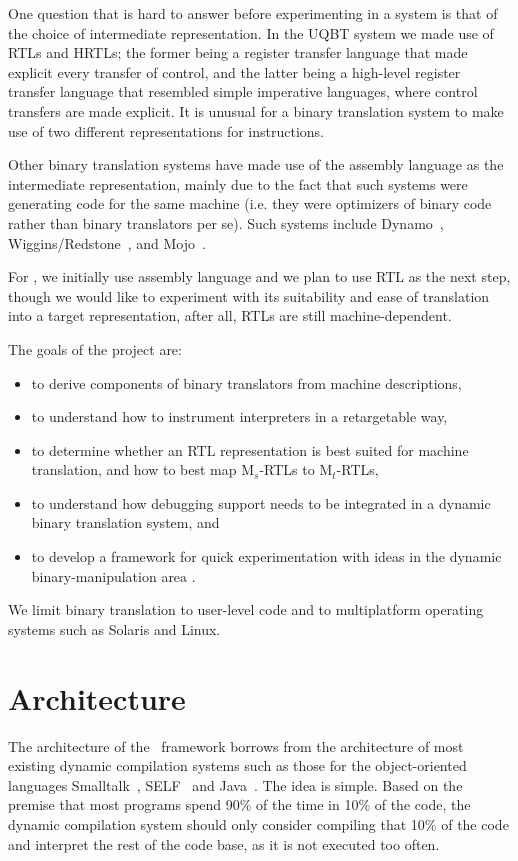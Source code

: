 One question that is hard to answer before experimenting in a system 
is that of the choice of intermediate representation. 
In the UQBT system we made use of RTLs and HRTLs; the former being a 
register transfer language that made explicit every transfer of control, 
and the latter being a high-level register transfer language that 
resembled simple imperative languages, where control transfers are 
made explicit.  It is unusual for a binary translation system to 
make use of two different representations for instructions.  

Other binary translation systems have made use of the assembly language 
as the intermediate representation, mainly due to the fact that such 
systems were generating code for the same machine (i.e. they were optimizers
of binary code rather than binary translators per se).  Such 
systems include Dynamo~\cite{Bala00}, Wiggins/Redstone~\cite{Reev00}, 
and Mojo~\cite{Chen00}. 

For \walk, we initially use assembly language and we plan to use
RTL as the next step, though we would like to experiment with its 
suitability and ease of translation into a target representation, 
after all, RTLs are still machine-dependent.  

The goals of the project are: 
\begin{itemize}
\item to derive components of binary translators from machine descriptions,
\item to understand how to instrument interpreters in a retargetable way, 
\item to determine whether an RTL representation is best suited for machine 
	translation, and how to best map M$_s$-RTLs to M$_t$-RTLs, 
\item to understand how debugging support needs to be integrated in 
	a dynamic binary translation system, and 
\item to develop a framework for quick experimentation with ideas in the 
	dynamic binary-manipulation area . 
\end{itemize}

We limit binary translation to user-level code and to multiplatform 
operating systems such as Solaris and Linux.  


\section{Architecture}

The architecture of the \walk\ framework borrows from the architecture 
of most existing dynamic compilation systems such as those for the 
object-oriented languages Smalltalk~\cite{Gold83,Deut84},  
SELF~\cite{Unga87,Holz94} and Java~\cite{Holz97,Grie00,Pale01}.
The idea is simple.  Based on the premise that most programs spend 
90\% of the time in 10\% of the code, the dynamic compilation 
system should only consider compiling that 10\% of the code and 
interpret the rest of the code base, as it is not executed too often. 

